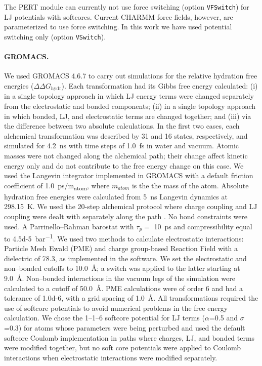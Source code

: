 \documentclass[journal=jctcce,manuscript=article]{achemso}
\newcommand{\inpopt}[1]{\texttt{#1}}
\begin{document}
The PERT module can currently not use force switching (option \inpopt{VFSwitch})
for LJ potentials with softcores.  Current CHARMM force fields,
however, are parameterized to use force switching. %
In this work we have used potential switching only (option \inpopt{VSwitch}).

\paragraph{GROMACS.} We used GROMACS 4.6.7 to carry out simulations for 
the relative hydration free energies ($\Delta \Delta G_{\mathrm{hydr}}$).
Each transformation had its Gibbs free energy calculated: (i) in a single 
topology approach in which LJ energy terms were changed separately 
from the electrostatic and bonded components; (ii) in a single topology 
approach in which bonded, LJ, and electrostatic terms are changed 
together;  and (iii) via the difference between two absolute calculations.
In the first two cases, each alchemical transformation was described by 31 and 
16 states, respectively, and simulated for \SI{4.2}{ns} with time steps of 
\SI{1.0}{fs} in water and vacuum. Atomic masses were not changed along the 
alchemical path; their change affect kinetic energy only and do not 
contribute to the free energy change on this case. 
We used the Langevin integrator implemented in GROMACS with a 
default friction coefficient of \SI{1.0}{ps/m_{atom}}, where $m_{atom}$
is the the mass of the atom.  Absolute hydration 
free energies were calculated from \SI{5}{ns} Langevin dynamics
at \SI{298.15}{K}. We used the 20-step alchemical protocol where 
charge coupling and LJ coupling were dealt with separately 
along the path \cite{Mobley2014, doi:10.1021/acs.jced.7b00104}.
No bond constraints were used. 
A Parrinello--Rahman barostat with $\tau_p =$ \SI{10}{ps} and compressibility 
equal to \SI{4.5d-5}{bar^{-1}}.
We used two methods to calculate electrostatic interactions: Particle Mesh 
Ewald (PME) and charge group-based Reaction Field with a dielectric of 78.3, 
as implemented in the software. 
We set the electrostatic and non--bonded cutoffs to \SI{10.0}{\angstrom};
a switch was applied to the latter starting at \SI{9.0}{\angstrom}. 
Non--bonded interactions in the vacuum legs of the simulation were calculated
to a cutoff of \SI{50.0}{\angstrom}. 
PME calculations were of order 6 and had a 
tolerance of \num{1.0d-6}, with a grid spacing of \SI{1.0}{\angstrom}. 
All transformations required the use of softcore potentials to avoid numerical 
problems in the free energy calculation.  We chose the 1--1--6 softcore 
potential for LJ terms ($\alpha$=0.5 and $\sigma$=0.3) for
atoms whose parameters were being perturbed
and used the default softcore Coulomb implementation in paths where 
charges, LJ, and bonded terms were modified together, 
but no soft core potentials were applied to Coulomb interactions when 
electrostatic interactions were modified separately. 
\end{document}
